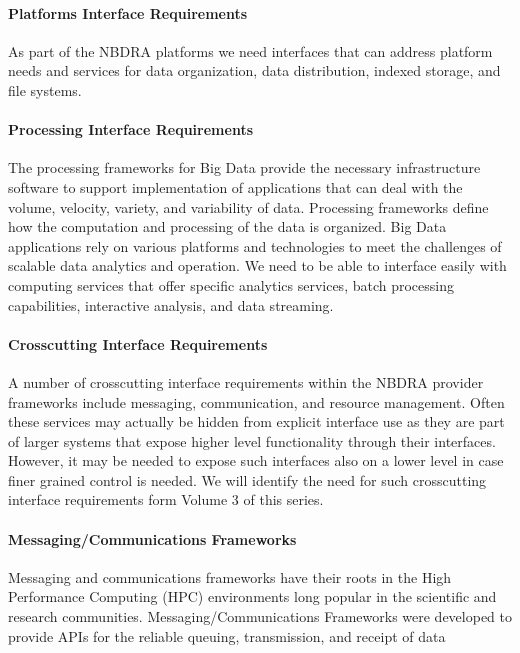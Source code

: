 \documentclass[10pt]{article}
\begin{document}
\paragraph{Platforms Interface Requirements}

As part of the NBDRA platforms we need interfaces that can address
platform needs and services for data organization, data distribution,
indexed storage, and file systems.

\paragraph{Processing Interface Requirements}

The processing frameworks for Big Data provide the necessary
infrastructure software to support implementation of applications that
can deal with the volume, velocity, variety, and variability of data.
Processing frameworks define how the computation and processing of the
data is organized. Big Data applications rely on various platforms and
technologies to meet the challenges of scalable data analytics and
operation. We need to be able to interface easily with computing
services that offer specific analytics services, batch processing
capabilities, interactive analysis, and data streaming.

\paragraph{Crosscutting Interface Requirements}

A number of crosscutting interface requirements within the NBDRA
provider frameworks include messaging, communication, and resource
management. Often these services may actually be hidden from explicit
interface use as they are part of larger systems that expose higher
level functionality through their interfaces. However, it may be
needed to expose such interfaces also on a lower level in case finer
grained control is needed. We will identify the need for such
crosscutting interface requirements form Volume 3 \cite{nist-vol-3} of
this series.

\paragraph{Messaging/Communications Frameworks}

Messaging and communications frameworks have their roots in the High
Performance Computing (HPC) environments long popular in the
scientific and research communities. Messaging/Communications
Frameworks were developed to provide APIs for the reliable queuing,
transmission, and receipt of data
\end{document}

